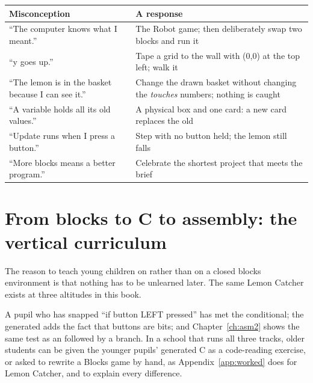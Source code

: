 \begin{center}
\begin{tabularx}{\linewidth}{@{}XX@{}}
\toprule
Misconception & A response \\
\midrule
``The computer knows what I meant.'' & The Robot game; then deliberately swap
  two blocks and run it \\
``y goes up.'' & Tape a grid to the wall with (0,0) at the top left; walk it \\
``The lemon is in the basket because I can see it.'' & Change the drawn
  basket without changing the \emph{touches} numbers; nothing is caught \\
``A variable holds all its old values.'' & A physical box and one card: a new
  card replaces the old \\
``Update runs when I press a button.'' & Step with no button held; the lemon
  still falls \\
``More blocks means a better program.'' & Celebrate the shortest project that
  meets the brief \\
\bottomrule
\end{tabularx}
\end{center}

\section{From blocks to C to assembly: the vertical curriculum}

The reason to teach young children on \prg rather than on a closed blocks
environment is that nothing has to be unlearned later. The same Lemon Catcher
exists at three altitudes in this book.



A pupil who has snapped ``if button LEFT pressed'' has met the conditional; the
generated  adds the fact that buttons are
bits; and Chapter~\ref{ch:asm2} shows the same test as an  followed
by a branch. In a school that runs all three tracks, older students can be
given the younger pupils' generated C as a code-reading exercise, or asked to
rewrite a Blocks game by hand, as Appendix~\ref{app:worked} does for Lemon
Catcher, and to explain every difference.

